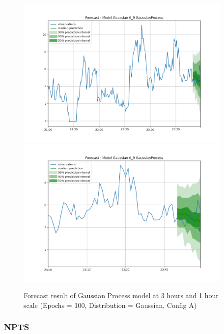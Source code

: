 \documentclass[a4paper, 12pt]{article}
\begin{document}
\begin{figure}[!h]
    \centering
    \includegraphics[width=400px]{plots/forecast/a/model/Gaussian/0_9/GaussianProcess/180.png}
    \includegraphics[width=400px]{plots/forecast/a/model/Gaussian/0_9/GaussianProcess/60.png}
    \caption{Forecast result of Gaussian Process model at 3 hours and 1 hour scale (Epochs = 100, Distribution = Gaussian, Config A)}
    \label{fig:mqrnn}
\end{figure}


\subsubsection{NPTS} \label{comp_npts}
\end{document}
